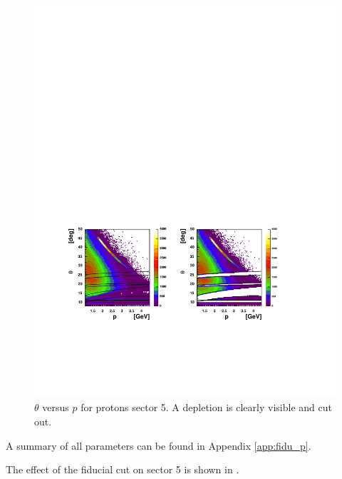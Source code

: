 \begin{figure}[h]
 \begin{center}
 \includegraphics[width = 15cm, bb=20 140 520 380]{data_reduction/img/proton_tp}  
  \caption[$\theta$ versus $p$ for protons sector 5]
          { $\theta$ versus $p$ for protons sector 5. A depletion is clearly visible and cut out.}
 \label{fig:proton_tp}
 \end{center}
\end{figure}

A summary of all parameters can be found in Appendix \ref{app:fidu_p}.

The effect of the fiducial cut on sector 5 is shown in .

